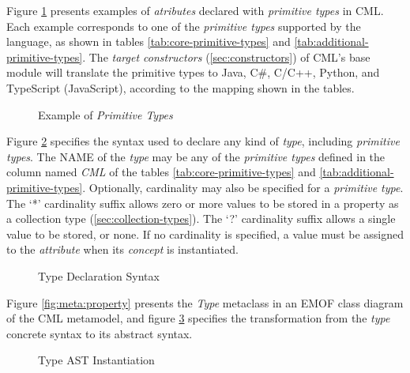 \begin{examples}
Figure \ref{fig:ex:primitive-types} presents examples
of \emph{atributes} declared with \emph{primitive types} in CML.
Each example corresponds to one of the \emph{primitive types} 
supported by the language,
as shown in tables \ref{tab:core-primitive-types} and \ref{tab:additional-primitive-types}.
The \emph{target constructors} (\ref{sec:constructors})
of CML's base module will translate the primitive types to Java, C\#, C/C++,
Python, and TypeScript (JavaScript),
according to the mapping shown in the tables.

\end{examples}

\begin{figure}
\verbatimfont{\small}

\caption{Example of \emph{Primitive Types}}
\label{fig:ex:primitive-types}
\end{figure}

\begin{concrete-syntax}
Figure \ref{fig:stx:type} specifies the syntax used
to declare any kind of \emph{type},
including \emph{primitive types}.
The NAME of the \emph{type} may be any of the \emph{primitive types}
defined in the column named \emph{CML}
of the tables \ref{tab:core-primitive-types} and \ref{tab:additional-primitive-types}.
Optionally, cardinality may also be specified
for a \emph{primitive type}.
The `*' cardinality suffix allows zero or more values to be stored
in a property as a collection type (\ref{sec:collection-types}).
The `?' cardinality suffix allows a single value to be stored, or none.
If no cardinality is specified,
a value must be assigned to the \emph{attribute}
when its \emph{concept} is instantiated.
\end{concrete-syntax}

\begin{figure}
\verbatimfont{\small}

\caption{Type Declaration Syntax}
\label{fig:stx:type}
\end{figure}

\begin{abstract-syntax}
Figure \ref{fig:meta:property} presents the \emph{Type} metaclass
in an EMOF \cite{mof} class diagram of the CML metamodel,
and figure \ref{fig:ast:type} specifies
the transformation
from the \emph{type} concrete syntax to its abstract syntax.
\end{abstract-syntax}

\begin{figure}
\verbatimfont{\small}

\caption{Type AST Instantiation}
\label{fig:ast:type}
\end{figure}

